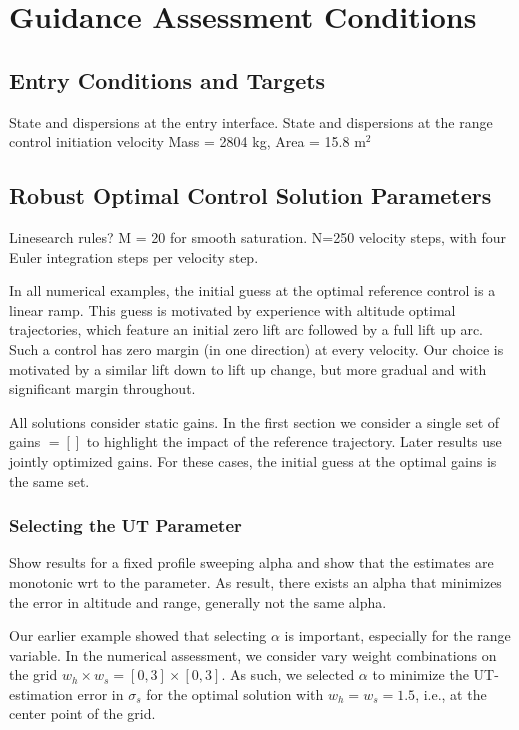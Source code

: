 \chapter{Guidance Assessment Conditions}\label{Ch:AssessmentConditions}

\section{Entry Conditions and Targets}
State and dispersions at the entry interface. State and dispersions at the range control initiation velocity 
Mass = 2804 kg, Area = 15.8 $\mathrm{m}^2$


\section{Robust Optimal Control Solution Parameters}
Linesearch rules? M = 20 for smooth saturation. N=250 velocity steps, with four Euler integration steps per velocity step. 

In all numerical examples, the initial guess at the optimal reference control is a linear ramp. This guess is motivated by experience with altitude optimal trajectories, which feature an initial zero lift arc followed by a full lift up arc. Such a control has zero margin (in one direction) at every velocity. Our choice is motivated by a similar lift down to lift up change, but more gradual and with significant margin throughout. 

All solutions consider static gains. In the first section we consider a single set of gains $=[]$ to highlight the impact of the reference trajectory. Later results use jointly optimized gains. For these cases, the initial guess at the optimal gains is the same set.

\subsection{Selecting the UT Parameter}
Show results for a fixed profile sweeping alpha and show that the estimates are monotonic wrt to the parameter. As result, there exists an alpha that minimizes the error in altitude and range, generally not the same alpha. 

Our earlier example showed that selecting $\alpha$ is important, especially for the range variable. In the numerical assessment, we consider vary weight combinations on the grid $w_h\times w_s = [0,3]\times[0,3]$. As such, we selected $\alpha$ to minimize the UT-estimation error in $\sigma_s$ for the optimal solution with $w_h=w_s=1.5$, i.e., at the center point of the grid. 


